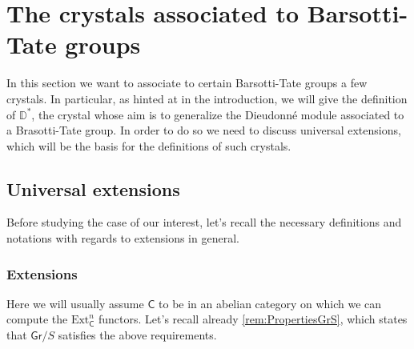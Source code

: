 \section{The crystals associated to Barsotti-Tate groups}
In this section we want to associate to certain Barsotti-Tate groups
a few crystals.
In particular, as hinted at in the introduction, we will give the definition
of $\mathbb{D}^*$, the crystal whose aim is to generalize the Dieudonné module
associated to a Brasotti-Tate group.
In order to do so we need to discuss universal extensions, which will be the basis
for the definitions of such crystals.



\subsection{Universal extensions}
Before studying the case of our interest, let's recall the necessary definitions
and notations with regards to extensions in general.



\subsubsection{Extensions}
Here we will usually assume $\mathsf{C}$ to be in an abelian category on which
we can compute the $\mathrm{Ext}^n_{\mathsf{C}}$ functors.
Let's recall already \cref{rem:PropertiesGrS}, which states that $\mathsf{Gr}/S$
satisfies the above requirements.


